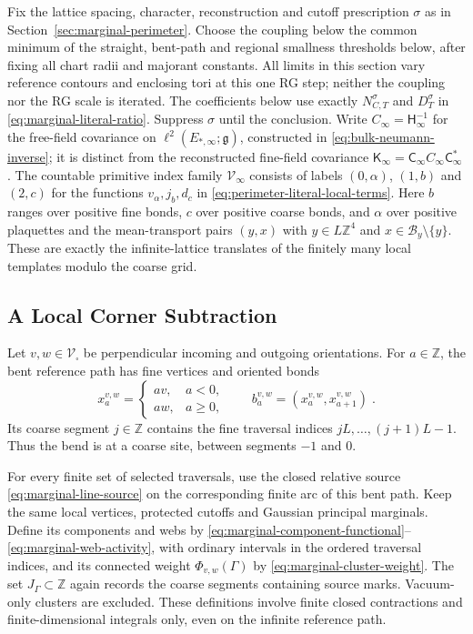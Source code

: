 \documentclass[11pt]{article}
\begin{document}
Fix the lattice spacing, character, reconstruction and cutoff prescription $\sigma$ as in Section~\ref{sec:marginal-perimeter}. Choose the coupling below the common minimum of the straight, bent-path and regional smallness thresholds below, after fixing all chart radii and majorant constants. All limits in this section vary reference contours and enclosing tori at this one RG step; neither the coupling nor the RG scale is iterated. The coefficients below use exactly $N_{C,T}^{\sigma}$ and $D_T^{\sigma}$ in \eqref{eq:marginal-literal-ratio}. Suppress $\sigma$ until the conclusion. Write $C_\infty=\mathsf H_\infty^{-1}$ for the free-field covariance on $\ell^2(E_{*,\infty};\mathfrak g)$, constructed in \eqref{eq:bulk-neumann-inverse}; it is distinct from the reconstructed fine-field covariance $\mathsf K_\infty=\mathsf C_\infty C_\infty\mathsf C_\infty^*$. The countable primitive index family $\mathcal V_\infty$ consists of labels $(0,\alpha)$, $(1,b)$ and $(2,c)$ for the functions $v_\alpha,j_b,d_c$ in \eqref{eq:perimeter-literal-local-terms}. Here $b$ ranges over positive fine bonds, $c$ over positive coarse bonds, and $\alpha$ over positive plaquettes and the mean-transport pairs $(y,x)$ with $y\in L\mathbb Z^4$ and $x\in\mathcal B_y\setminus\{y\}$. These are exactly the infinite-lattice translates of the finitely many local templates modulo the coarse grid.

\subsection{A Local Corner Subtraction}

Let $v,w\in \mathscr V_\square$ be perpendicular incoming and outgoing orientations. For $a\in \mathbb Z$, the bent reference path has fine vertices and oriented bonds
\begin{equation}\label{eq:corner-bent-path}
    x_a^{v,w}=
    \begin{cases}
        av,&a<0,\\
        aw,&a\geq 0,
    \end{cases}
    \qquad b_a^{v,w}=(x_a^{v,w},x_{a+1}^{v,w})\;.
\end{equation}
Its coarse segment $j\in \mathbb Z$ contains the fine traversal indices $jL,\ldots,(j+1)L-1$. Thus the bend is at a coarse site, between segments $-1$ and $0$.

For every finite set of selected traversals, use the closed relative source \eqref{eq:marginal-line-source} on the corresponding finite arc of this bent path. Keep the same local vertices, protected cutoffs and Gaussian principal marginals. Define its components and webs by \eqref{eq:marginal-component-functional}--\eqref{eq:marginal-web-activity}, with ordinary intervals in the ordered traversal indices, and its connected weight $\Phi_{v,w}(\Gamma)$ by \eqref{eq:marginal-cluster-weight}. The set $J_\Gamma\subset \mathbb Z$ again records the coarse segments containing source marks. Vacuum-only clusters are excluded. These definitions involve finite closed contractions and finite-dimensional integrals only, even on the infinite reference path.
\end{document}
